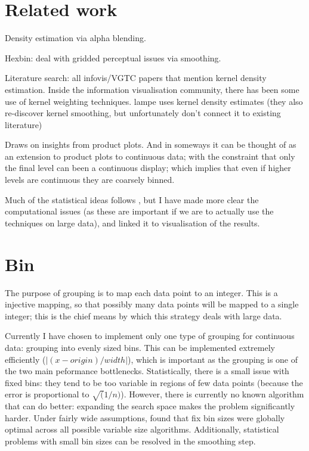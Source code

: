 \documentclass[journal]{vgtc}                %
\begin{document}
\section{Related work}
\label{sec:related-work}

Density estimation via alpha blending.

Hexbin: deal with gridded perceptual issues via smoothing.

Literature search: all infovis/VGTC papers that mention kernel density estimation.  Inside the information visualisation community, there has been some use of kernel weighting techniques.  lampe uses kernel density estimates (they also re-discover kernel smoothing, but unfortunately don't connect it to existing literature)

Draws on insights from product plots. And in someways it can be thought of as an extension to product plots to continuous data; with the constraint that only the final level can been a continuous display; which implies that even if higher levels are continuous they are coarsely binned.

Much of the statistical ideas follows \citep{hardle:1992}, but I have made more clear the computational issues (as these are important if we are to actually use the techniques on large data), and linked it to visualisation of the results.

\section{Bin}
\label{sec:bin}

The purpose of grouping is to map each data point to an integer.  This is a injective mapping, so that possibly many data points will be mapped to a single integer; this is the chief means by which this strategy deals with large data.

Currently I have chosen to implement only one type of grouping for continuous data: grouping into evenly sized bins.  This can be implemented extremely efficiently ($\left | (x - origin) / width  \right |$), which is important as the grouping is one of the two main peformance bottlenecks. Statistically, there is a small issue with fixed bins: they tend to be too variable in regions of few data points (because the error is proportional to $\sqrt(1/n)$). However, there is currently no known algorithm that can do better: expanding the search space makes the problem significantly harder.  Under fairly wide assumptions, \citet{kogure:1987} found that fix bin sizes were globally optimal across all possible variable size algorithms.  Additionally, statistical problems with small bin sizes can be resolved in the smoothing step.
\end{document}
